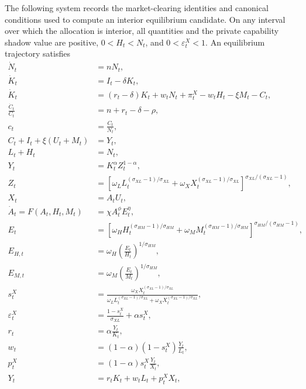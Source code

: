 The following system records the market-clearing identities and canonical conditions
used to compute an interior equilibrium candidate. On any interval over which
the allocation is interior, all quantities and the private capability shadow value are positive,
$0<H_t<N_t$, and $0<\varepsilon^X_t<1$. An equilibrium trajectory satisfies
\begin{subequations}
\label{eq:equilibrium-trajectory-system}
\begin{align}
    \dot N_t&=nN_t,
    \label{eq:eqsys-population}\\
    \dot K_t&=I_t-\delta K_t,
    \label{eq:eqsys-capital}\\
    \dot K_t&=(r_t-\delta)K_t+w_tN_t+\pi^X_t-w_tH_t-\xi M_t-C_t,
    \label{eq:eqsys-household-budget}\\
    \frac{\dot C_t}{C_t}&=n+r_t-\delta-\rho,
    \label{eq:eqsys-consumption}\\
    c_t&=\frac{C_t}{N_t},
    \label{eq:eqsys-per-capita-consumption}\\
    C_t+I_t+\xi(U_t+M_t)&=Y_t,
    \label{eq:eqsys-resources}\\
    L_t+H_t&=N_t,
    \label{eq:eqsys-labor}\\
    Y_t&=K_t^\alpha Z_t^{1-\alpha},
    \label{eq:eqsys-output}\\
    Z_t&=
    \left[
        \omega_L L_t^{(\sigma_{XL}-1)/\sigma_{XL}}
        +\omega_X X_t^{(\sigma_{XL}-1)/\sigma_{XL}}
    \right]^{\sigma_{XL}/(\sigma_{XL}-1)},
    \label{eq:eqsys-production}\\
    X_t&=A_tU_t,
    \label{eq:eqsys-ai-services}\\
    \dot A_t=F(A_t,H_t,M_t)&=\chi A_t^\phi E_t^\eta,
    \label{eq:eqsys-capability}\\
    E_t&=
    \left[
        \omega_H H_t^{(\sigma_{HM}-1)/\sigma_{HM}}
        +\omega_M M_t^{(\sigma_{HM}-1)/\sigma_{HM}}
    \right]^{\sigma_{HM}/(\sigma_{HM}-1)},
    \label{eq:eqsys-research}\\
    E_{H,t}&=\omega_H\left(\frac{E_t}{H_t}\right)^{1/\sigma_{HM}},
    \label{eq:eqsys-human-research-marginal-product}\\
    E_{M,t}&=\omega_M\left(\frac{E_t}{M_t}\right)^{1/\sigma_{HM}},
    \label{eq:eqsys-machine-research-marginal-product}\\
    s^X_t&=
    \frac{\omega_X X_t^{(\sigma_{XL}-1)/\sigma_{XL}}}
    {\omega_L L_t^{(\sigma_{XL}-1)/\sigma_{XL}}
        +\omega_X X_t^{(\sigma_{XL}-1)/\sigma_{XL}}},
    \label{eq:eqsys-ai-share}\\
    \varepsilon^X_t&=
    \frac{1-s^X_t}{\sigma_{XL}}+\alpha s^X_t,
    \label{eq:eqsys-inverse-elasticity}\\
    r_t&=\alpha\frac{Y_t}{K_t},
    \label{eq:eqsys-capital-price}\\
    w_t&=(1-\alpha)(1-s^X_t)\frac{Y_t}{L_t},
    \label{eq:eqsys-wage}\\
    p^X_t&=(1-\alpha)s^X_t\frac{Y_t}{X_t},
    \label{eq:eqsys-ai-price}\\
    Y_t&=r_tK_t+w_tL_t+p^X_tX_t,
    \label{eq:eqsys-final-firm-zero-profit}
\end{align}
\end{subequations}
